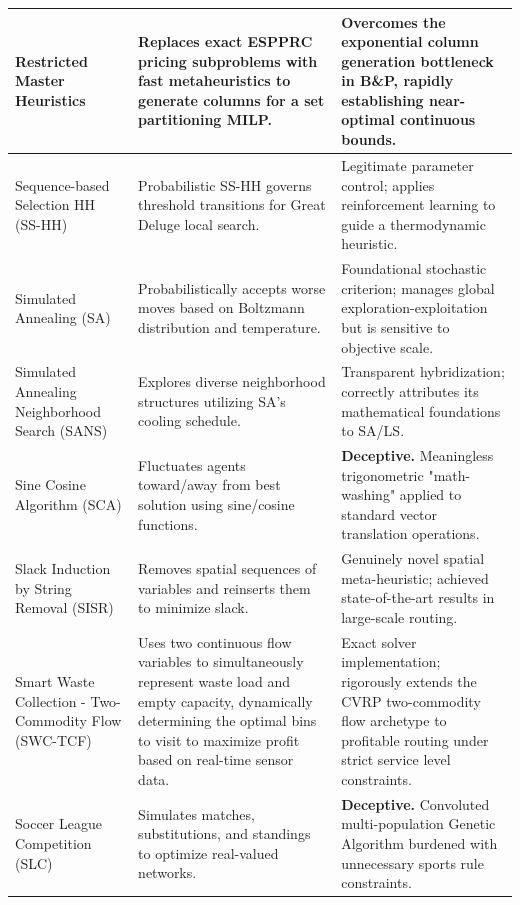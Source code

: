 \begin{center}
\begin{longtable}{
  >{\raggedright\arraybackslash}p{}
  >{\raggedright\arraybackslash}p{}
  >{\raggedright\arraybackslash}p{}
}
Restricted Master Heuristics & Replaces exact ESPPRC pricing subproblems with fast metaheuristics to generate columns for a set partitioning MILP. & Overcomes the exponential column generation bottleneck in B\&P, rapidly establishing near-optimal continuous bounds. \\ \midrule

Sequence-based Selection HH (SS-HH) & Probabilistic SS-HH governs threshold transitions for Great Deluge local search. & Legitimate parameter control; applies reinforcement learning to guide a thermodynamic heuristic. \\ \midrule

Simulated Annealing (SA) & Probabilistically accepts worse moves based on Boltzmann distribution and temperature. & Foundational stochastic criterion; manages global exploration-exploitation but is sensitive to objective scale. \\ \midrule

Simulated Annealing Neighborhood Search (SANS) & Explores diverse neighborhood structures utilizing SA's cooling schedule. & Transparent hybridization; correctly attributes its mathematical foundations to SA/LS. \\ \midrule

Sine Cosine Algorithm (SCA) & Fluctuates agents toward/away from best solution using sine/cosine functions. & \textbf{Deceptive.} Meaningless trigonometric "math-washing" applied to standard vector translation operations. \\ \midrule

Slack Induction by String Removal (SISR) & Removes spatial sequences of variables and reinserts them to minimize slack. & Genuinely novel spatial meta-heuristic; achieved state-of-the-art results in large-scale routing. \\ \midrule

Smart Waste Collection - Two-Commodity Flow (SWC-TCF) & Uses two continuous flow variables to simultaneously represent waste load and empty capacity, dynamically determining the optimal bins to visit to maximize profit based on real-time sensor data. & Exact solver implementation; rigorously extends the CVRP two-commodity flow archetype to profitable routing under strict service level constraints. \\ \midrule

Soccer League Competition (SLC) & Simulates matches, substitutions, and standings to optimize real-valued networks. & \textbf{Deceptive.} Convoluted multi-population Genetic Algorithm burdened with unnecessary sports rule constraints. \\ \midrule


\end{longtable}
\end{center}
